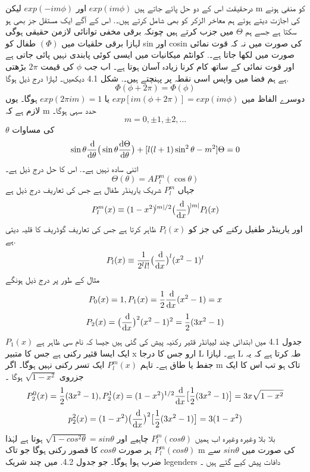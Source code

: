 \documentclass{book}
\begin{document}
درحقیقت اس کے دو حل پائے جاتے ہیں 
\(exp(im\phi)\)
اور 
\(exp(-im\phi)\)
لیکن m کو منفی ہونے کی اجازت دیتے ہوئے ہم معاخر الزکر کو بھی شامل کرتے ہیں۔.
اس کے آگے ایک مستقل جز بھی ہو سکتا ہے جسے ہم
 \(\Theta\)
  میں جزب کرتے ہیں چونکہ برقی مخفی توانائی لازمن حقیقی ہوگی لہازا برقی حلقیات میں
  \((\Phi)\)
    طفال کو sin اور cosin کی صورت میں نہ کہ قوت نمائی صورت میں لکھا جاتا ہے۔.
کوانٹم میکانیات میں ایسی کوئی پابندی نہیں پائی جاتی ہے اور قوت نمائی کے ساتھ کام کرنا زیادہ آسان ہوتا ہے۔
اب جب
 \(\phi\)
  کی قیمت
  \(2\pi\)
    بڑھتی ہے ہم فضا میں واپس اسی نقطہ پر پہنچتے ہیں۔.
شکل 4.1 دیکھیں۔
لہازا درج ذیل ہوگا.\\
\[\Phi(\phi+2\pi)=\Phi(\phi)\]
دوسرے الفاظ میں 
\(exp[im(\phi+2\pi)]=exp(im\phi)\)
یا
\(exp(2\pi im)=1\)
ہوگا۔
یوں لازم ہے کہ m حدد سہی ہوگا۔
\[m=0,\pm 1,\pm 2,\dotsc\]
 \(\theta\)
  کی مساوات
\[\sin{\theta}\frac{\dif}{\dif{\theta}}\big(\sin{\theta}\frac{\dif{\Theta}}{\dif{\theta}}\big)+[l(l+1)\sin^{2}{\theta}-m^{2}]\Theta=0\]
اتنی سادہ نہیں ہے۔.
اس کا حل درج ذیل ہے۔\\
\[\Theta(\theta)=AP_{l}^{m}(\cos{\theta})\]
جہاں
 \(P_{l}^{m}\) 
شریک یارینڈر طفال ہے جس کی تعاریف درج ذیل ہے \\
\[P_{l}^{m}(x)\equiv (1-x^{2})^{\abs{m}/2}\big(\frac{\dif}{\dif{x}}\big)^{\abs{m}}P_{l}(x)\]
اور یارینڈر طفیل رکنے کی جز کو
 \(P_{l}(x)\)
  ظاہر کرتا ہے جس کی تعاریف گوڈریف کا قلیہ دیتی ہے. \\
\[P_{l}(x)\equiv\frac{1}{2^{l}l!}\big(\frac{\dif}{\dif{x}}\big)^{l}(x^{2}-1)^{l}\]
مثال کے طور پر درج ذیل ہونگے \\
\[P_{0}(x)=1,P_{1}(x)=\frac{1}{2}\frac{\dif}{\dif{x}}(x^{2}-1)=x\]
\[P_{2}(x)=\big(\frac{\dif}{\dif{x}}\big)^{2}(x^{2}-1)^{2}=\frac{1}{2}(3x^{2}-1)\]
جدول 4.1 میں ابتدائی چند لییانڈر قثیر رکنیہ پیش کی گئی ہیں جیسا کہ نام سی ظاہر ہے 
\(P_{1}(x)\)
ایک ایسا قثیر رکنی ہے جس کا متبیر x ارو جس کا درجا L ہے۔
لہازا L طہ کرتا ہے کہ یہ جفط یا طاق ہے۔
تاہم
 \(P_{l}^{m}(x)\)
  ایک تسر رکنی نہیں ہوگا۔
اگر  m تاک ہو تب اس کا ایک جزروی 
\(\sqrt{1-x^{2}}\)
ہوگا ۔\\
\[P_{2}^{0}(x)=\frac{1}{2}(3x^{2}-1), P_{2}^{1}(x)=(1-x^{2})^{1/2}\frac{\dif}{\dif{x}}\big[\frac{1}{2}(3x^{2}-1)\big]=3x\sqrt{1-x^{2}}\]
\[p_{2}^{2}(x)=(1-x^{2})\big(\frac{\dif}{\dif{x}}\big)^{2}\big[\frac{1}{2}(3x^{2}-1)\big]=3(1-x^{2})\]
بلا بلا وغیرہ وغیرہ 
اب ہمیں
\(P_{l}^{m}(cos\theta)\)
چاہیے اور
\(\sqrt{1-cos^{2}\theta}=sin\theta\)
ہوتا ہے لہٰذا
\(P_{l}^{m}(cos\theta)\)
ہر صورت
\(cos\theta\)
کا قصور ركنی ہوگا جو تاک m کی صورت میں
\(sin\theta\)
سے ضرب ہوا ہوگا۔
جو جدول 
4.2.
میں چند شریک legenders دافات پیش کیے گئے ہیں ۔\\
\end{document}
